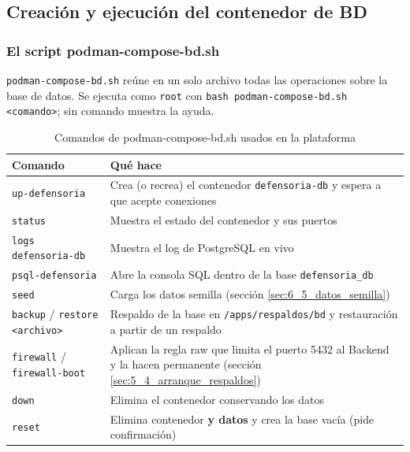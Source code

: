 \subsection{Creación y ejecución del contenedor de BD}\label{sec:5_3_contenedor_bd}

\subsubsection{El script podman-compose-bd.sh}
\texttt{podman-compose-bd.sh} reúne en un solo archivo todas las operaciones sobre la base de datos. Se ejecuta como \texttt{root} con \texttt{bash podman-compose-bd.sh <comando>}; sin comando muestra la ayuda.

\begin{table}[H]
\centering
\caption{Comandos de podman-compose-bd.sh usados en la plataforma}
\small
\begin{tabular}{p{4.2cm}p{10.2cm}}
\toprule
\textbf{Comando} & \textbf{Qué hace} \\
\midrule
\texttt{up-defensoria} & Crea (o recrea) el contenedor \texttt{defensoria-db} y espera a que acepte conexiones \\
\texttt{status} & Muestra el estado del contenedor y sus puertos \\
\texttt{logs defensoria-db} & Muestra el log de PostgreSQL en vivo \\
\texttt{psql-defensoria} & Abre la consola SQL dentro de la base \texttt{defensoria\_db} \\
\texttt{seed} & Carga los datos semilla (sección \ref{sec:6_5_datos_semilla}) \\
\texttt{backup} / \texttt{restore <archivo>} & Respaldo de la base en \nolinkurl{/apps/respaldos/bd} y restauración a partir de un respaldo \\
\texttt{firewall} / \texttt{firewall-boot} & Aplican la regla raw que limita el puerto 5432 al Backend y la hacen permanente (sección \ref{sec:5_4_arranque_respaldos}) \\
\texttt{down} & Elimina el contenedor conservando los datos \\
\texttt{reset} & Elimina contenedor \textbf{y datos} y crea la base vacía (pide confirmación) \\
\bottomrule
\end{tabular}
\end{table}


